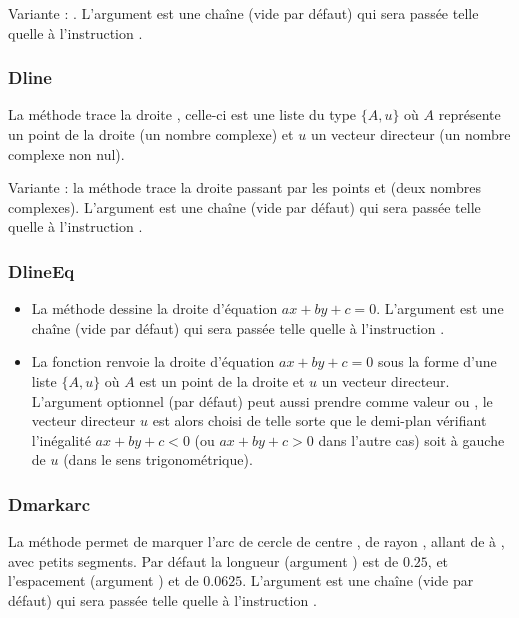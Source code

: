 Variante : . L'argument  est une chaîne (vide par défaut) qui sera passée telle quelle à l'instruction \drawcmd. \arguScale


\subsubsection{Dline}
La méthode  trace la droite , celle-ci est une liste du type $\{A,u\}$ où $A$ représente un point de la droite (un nombre complexe) et $u$ un vecteur directeur (un nombre complexe non nul). 

Variante : la méthode  trace la droite passant par les points  et  (deux nombres complexes). L'argument  est une chaîne (vide par défaut) qui sera passée telle quelle à l'instruction \drawcmd. \arguScale

\subsubsection{DlineEq}
\begin{itemize}
    \item La méthode  dessine la droite d'équation \(ax+by+c=0\). L'argument  est une chaîne (vide par défaut) qui sera passée telle quelle à l'instruction \drawcmd. \arguScale
    
    \item La fonction  renvoie la droite d'équation \(ax+by+c=0\) sous la forme d'une liste $\{A,u\}$ où $A$ est un point de la droite et $u$ un vecteur directeur. L'argument optionnel  (\nil par défaut) peut aussi prendre comme valeur  ou , le vecteur directeur $u$ est alors choisi de telle sorte que le demi-plan vérifiant l'inégalité $ax+by+c<0$ (ou $ax+by+c>0$ dans l'autre cas) soit à gauche de $u$ (dans le sens trigonométrique).
\end{itemize}

\subsubsection{Dmarkarc}
La méthode  permet de marquer l'arc de cercle de centre , de rayon , allant de  à , avec  petits segments. Par défaut la longueur (argument ) est de $0.25$, et l'espacement (argument ) et de $0.0625$. L'argument  est une chaîne (vide par défaut) qui sera passée telle quelle à l'instruction \drawcmd.

